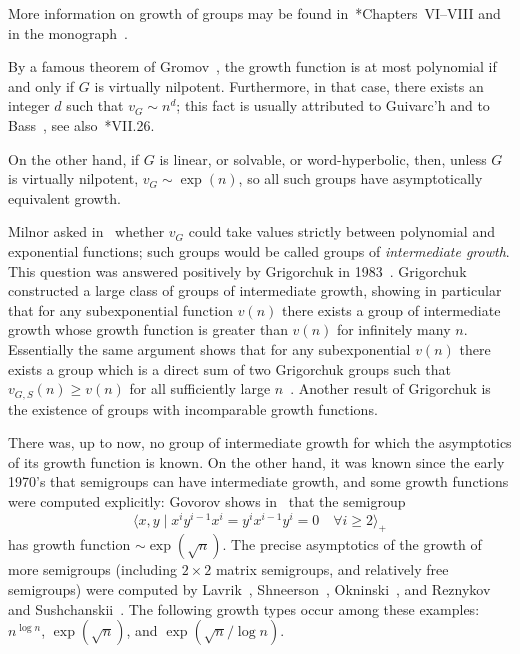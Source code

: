 \documentclass{amsart}
\theoremstyle{definition}
\begin{document}
More information on growth of groups may be found
in~\cite{harpe:ggt}*{Chapters~VI--VIII} and in the
monograph~\cite{mann:growth}.


By a famous theorem of Gromov~\cite{gromov:nilpotent}, the growth
function is at most polynomial if and only if $G$ is virtually
nilpotent. Furthermore, in that case, there exists an integer $d$ such
that $v_G\sim n^d$; this fact is usually attributed to Guivarc'h and
to Bass~\cite{bass:nilpotent}, see also~\cite{harpe:ggt}*{VII.26}.

On the other hand, if $G$ is linear, or solvable, or word-hyperbolic,
then, unless $G$ is virtually nilpotent, $v_G\sim\exp(n)$, so all such
groups have asymptotically equivalent growth.

Milnor asked in~\cite{milnor:5603} whether $v_G$ could take values
strictly between polynomial and exponential functions; such groups
would be called groups of \emph{intermediate growth}. This question
was answered positively by Grigorchuk in
1983~\cites{grigorchuk:growth,grigorchuk:gdegree,grigorchuk:kyoto}.
Grigorchuk constructed a large class of groups of intermediate growth,
showing in particular that for any subexponential function $v(n)$
there exists a group of intermediate growth whose growth function is
greater than $v(n)$ for infinitely many $n$. Essentially the same
argument shows that for any subexponential $v(n)$ there exists a group
which is a direct sum of two Grigorchuk groups such that $v_{G,S}(n)
\ge v(n)$ for all sufficiently large $n$~\cite{erschler:degrees}.
Another result of Grigorchuk is the existence of groups with
incomparable growth functions.

There was, up to now, no group of intermediate growth for which the
asymptotics of its growth function is known. On the other hand, it was
known since the early 1970's that semigroups can have intermediate
growth, and some growth functions were computed explicitly: Govorov
shows in~\cite{MR0318199} that the semigroup
\[\langle x,y\mid x^iy^{i-1}x^i=y^ix^{i-1}y^i=0\quad\forall i\ge2\rangle_+\]
has growth function $\sim \exp(\sqrt n)$. The precise asymptotics of
the growth of more semigroups (including $2\times 2$ matrix
semigroups, and relatively free semigroups) were computed by
Lavrik~\cite{lavrik:interm}, Shneerson~\cite{shneerson:interm},
Okninski~\cite{MR2001g:20076}, and Reznykov and
Sushchanskii~\cite{bartholdi-r-s:interm2x2}. The following growth
types occur among these examples: $n^{\log n}$, $\exp(\sqrt n)$, and
$\exp(\sqrt n/\log n)$.
\end{document}
